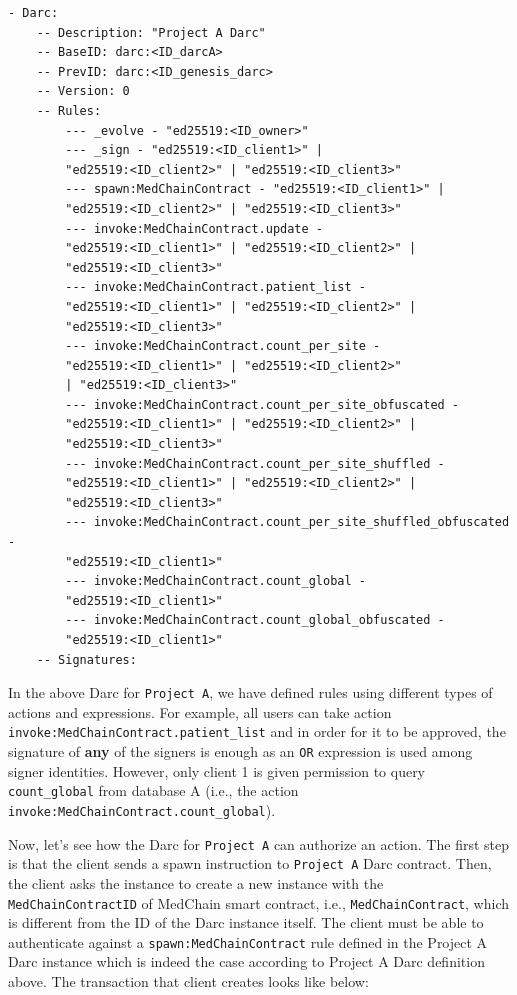 \begin{verbatim}
- Darc:
    -- Description: "Project A Darc"
    -- BaseID: darc:<ID_darcA>
    -- PrevID: darc:<ID_genesis_darc>
    -- Version: 0
    -- Rules:
        --- _evolve - "ed25519:<ID_owner>" 
        --- _sign - "ed25519:<ID_client1>" | 
        "ed25519:<ID_client2>" | "ed25519:<ID_client3>"
        --- spawn:MedChainContract - "ed25519:<ID_client1>" | 
        "ed25519:<ID_client2>" | "ed25519:<ID_client3>"
        --- invoke:MedChainContract.update - 
        "ed25519:<ID_client1>" | "ed25519:<ID_client2>" |
        "ed25519:<ID_client3>"
        --- invoke:MedChainContract.patient_list - 
        "ed25519:<ID_client1>" | "ed25519:<ID_client2>" |
        "ed25519:<ID_client3>"
        --- invoke:MedChainContract.count_per_site - 
        "ed25519:<ID_client1>" | "ed25519:<ID_client2>" 
        | "ed25519:<ID_client3>"
        --- invoke:MedChainContract.count_per_site_obfuscated - 
        "ed25519:<ID_client1>" | "ed25519:<ID_client2>" | 
        "ed25519:<ID_client3>"
        --- invoke:MedChainContract.count_per_site_shuffled - 
        "ed25519:<ID_client1>" | "ed25519:<ID_client2>" |
        "ed25519:<ID_client3>"
        --- invoke:MedChainContract.count_per_site_shuffled_obfuscated - 
        "ed25519:<ID_client1>" 
        --- invoke:MedChainContract.count_global - 
        "ed25519:<ID_client1>" 
        --- invoke:MedChainContract.count_global_obfuscated - 
        "ed25519:<ID_client1>" 
    -- Signatures:
\end{verbatim}

In the above Darc for \texttt{Project A}, we have defined rules using different types of actions and expressions. For example, all users can take action  \texttt{invoke:MedChainContract.patient\_list} and in order for it to be approved, the signature of \textbf{any} of the signers is enough as an \texttt{OR} expression is used among signer identities. However, only client 1 is given permission to query \texttt{count\_global} from database A (i.e., the action \texttt{invoke:MedChainContract.count\_global}). 

Now, let's see how the Darc for \texttt{Project A} can authorize an action. The first step is that the client sends a spawn instruction to \texttt{Project A} Darc contract. Then, the client asks the instance to create a new instance with the \texttt{MedChainContractID} of MedChain smart contract, i.e., \texttt{MedChainContract}, which is different from the ID of the Darc instance itself. The client must be able to authenticate against a \texttt{spawn:MedChainContract} rule defined in the Project A Darc instance which is indeed the case according to Project A Darc definition above. The transaction that client creates looks like below:

